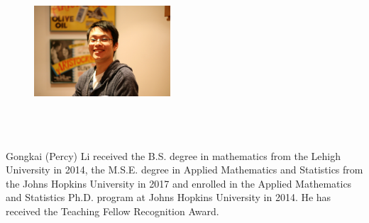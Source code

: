 
\begin{vita}

\begin{figure}
\includegraphics[width=2in,height=2.5in,clip,keepaspectratio]{Percy}
\end{figure}

Gongkai (Percy) Li received the B.S. degree in mathematics from the Lehigh University in 2014, the M.S.E. degree in Applied Mathematics and Statistics from the Johns Hopkins University in 2017 and enrolled in the Applied Mathematics and Statistics Ph.D. program at Johns Hopkins University in 2014. He has received the Teaching Fellow Recognition Award.


\end{vita}